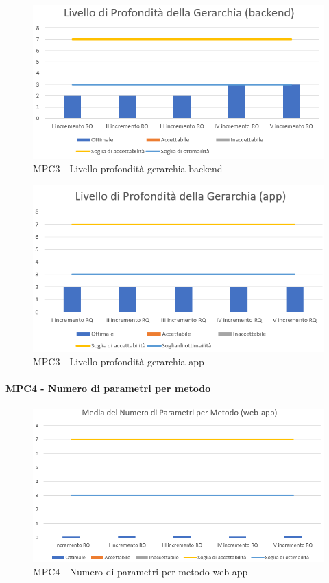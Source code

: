   \begin{figure}[h!]
    \centering
      \includegraphics[scale=1]{Immagini/LivProGer BE.PNG}
    \caption{MPC3 - Livello profondità gerarchia backend}
  \end{figure}

  \begin{figure}[h!]
    \centering
      \includegraphics[scale=1]{Immagini/LivProGer APP.PNG}
    \caption{MPC3 - Livello profondità gerarchia app}
  \end{figure}

  
  \clearpage
  \paragraph{MPC4 - Numero di parametri per metodo}
  \begin{figure}[h!]
    \centering
      \includegraphics[scale=1]{Immagini/MediaNumPar WA.PNG}
    \caption{MPC4 - Numero di parametri per metodo web-app}
  \end{figure}

